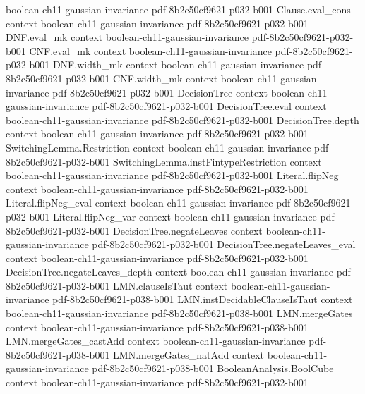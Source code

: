 \begin{theorem}
  {boolean-ch11-gaussian-invariance}
  {pdf-8b2c50cf9621-p032-b001}
\proofstep
  {Clause.eval_cons}
  {context}
  {boolean-ch11-gaussian-invariance}
  {pdf-8b2c50cf9621-p032-b001}
\proofstep
  {DNF.eval_mk}
  {context}
  {boolean-ch11-gaussian-invariance}
  {pdf-8b2c50cf9621-p032-b001}
\proofstep
  {CNF.eval_mk}
  {context}
  {boolean-ch11-gaussian-invariance}
  {pdf-8b2c50cf9621-p032-b001}
\proofstep
  {DNF.width_mk}
  {context}
  {boolean-ch11-gaussian-invariance}
  {pdf-8b2c50cf9621-p032-b001}
\proofstep
  {CNF.width_mk}
  {context}
  {boolean-ch11-gaussian-invariance}
  {pdf-8b2c50cf9621-p032-b001}
\proofstep
  {DecisionTree}
  {context}
  {boolean-ch11-gaussian-invariance}
  {pdf-8b2c50cf9621-p032-b001}
\proofstep
  {DecisionTree.eval}
  {context}
  {boolean-ch11-gaussian-invariance}
  {pdf-8b2c50cf9621-p032-b001}
\proofstep
  {DecisionTree.depth}
  {context}
  {boolean-ch11-gaussian-invariance}
  {pdf-8b2c50cf9621-p032-b001}
\proofstep
  {SwitchingLemma.Restriction}
  {context}
  {boolean-ch11-gaussian-invariance}
  {pdf-8b2c50cf9621-p032-b001}
\proofstep
  {SwitchingLemma.instFintypeRestriction}
  {context}
  {boolean-ch11-gaussian-invariance}
  {pdf-8b2c50cf9621-p032-b001}
\proofstep
  {Literal.flipNeg}
  {context}
  {boolean-ch11-gaussian-invariance}
  {pdf-8b2c50cf9621-p032-b001}
\proofstep
  {Literal.flipNeg_eval}
  {context}
  {boolean-ch11-gaussian-invariance}
  {pdf-8b2c50cf9621-p032-b001}
\proofstep
  {Literal.flipNeg_var}
  {context}
  {boolean-ch11-gaussian-invariance}
  {pdf-8b2c50cf9621-p032-b001}
\proofstep
  {DecisionTree.negateLeaves}
  {context}
  {boolean-ch11-gaussian-invariance}
  {pdf-8b2c50cf9621-p032-b001}
\proofstep
  {DecisionTree.negateLeaves_eval}
  {context}
  {boolean-ch11-gaussian-invariance}
  {pdf-8b2c50cf9621-p032-b001}
\proofstep
  {DecisionTree.negateLeaves_depth}
  {context}
  {boolean-ch11-gaussian-invariance}
  {pdf-8b2c50cf9621-p032-b001}
\proofstep
  {LMN.clauseIsTaut}
  {context}
  {boolean-ch11-gaussian-invariance}
  {pdf-8b2c50cf9621-p038-b001}
\proofstep
  {LMN.instDecidableClauseIsTaut}
  {context}
  {boolean-ch11-gaussian-invariance}
  {pdf-8b2c50cf9621-p038-b001}
\proofstep
  {LMN.mergeGates}
  {context}
  {boolean-ch11-gaussian-invariance}
  {pdf-8b2c50cf9621-p038-b001}
\proofstep
  {LMN.mergeGates_castAdd}
  {context}
  {boolean-ch11-gaussian-invariance}
  {pdf-8b2c50cf9621-p038-b001}
\proofstep
  {LMN.mergeGates_natAdd}
  {context}
  {boolean-ch11-gaussian-invariance}
  {pdf-8b2c50cf9621-p038-b001}
\proofstep
  {BooleanAnalysis.BoolCube}
  {context}
  {boolean-ch11-gaussian-invariance}
  {pdf-8b2c50cf9621-p032-b001}

\end{theorem}
